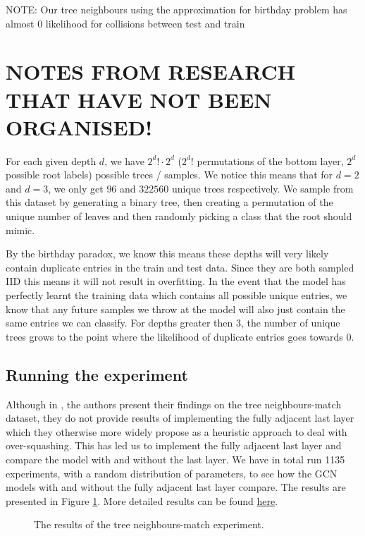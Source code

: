 \documentclass[a4paper,12pt]{article}
\begin{document}
NOTE:
Our tree neighbours using the approximation for birthday problem has almost 0 likelihood for collisions between test and train


\section{NOTES FROM RESEARCH THAT HAVE NOT BEEN ORGANISED!}

For each given depth \(d\), we have \(2^{d}! \cdot 2^{d}\) (\(2^{d}!\) permutations of the bottom layer, \(2^{d}\) possible root labels) possible trees / samples. We notice this means that for \(d=2\) and \(d=3\), we only get \(96\) and \(322560\) unique trees respectively.
We sample from this dataset by generating a binary tree, then creating a permutation of the unique number of leaves and then randomly picking a class that the root should mimic.

By the birthday paradox, we know this means these depths will very likely contain duplicate entries in the train and test data. Since they are both sampled IID this means it will not result in overfitting. In the event that the model has perfectly learnt the training data which contains all possible unique entries, we know that any future samples we throw at the model will also just contain the same entries we can classify.
For depths greater then 3, the number of unique trees grows to the point where the likelihood of duplicate entries goes towards 0.


\subsection{Running the experiment} %

Although in \cite{alon_bottleneck_2021}, the authors present their findings on the tree neighbours-match dataset, they do not provide results of implementing the fully adjacent last layer which they otherwise more widely propose as a heuristic approach to deal with over-squashing.
This has led us to implement the fully adjacent last layer and compare the model with and without the last layer. We have in total run 1135 experiments, with a random distribution of parameters, to see how the GCN models with and without the fully adjacent last layer compare. The results are presented in Figure \ref{fig:tree_experiment_graph}. More detailed results can be found \href{PLACE SOMETHING HERE MAYBE A LINK TO THE RESULTS IN THE}{here}.

\begin{figure}[H]
  \centering
  
  \caption{The results of the tree neighbours-match experiment.}
  \label{fig:tree_experiment_graph}
\end{figure}
\end{document}
